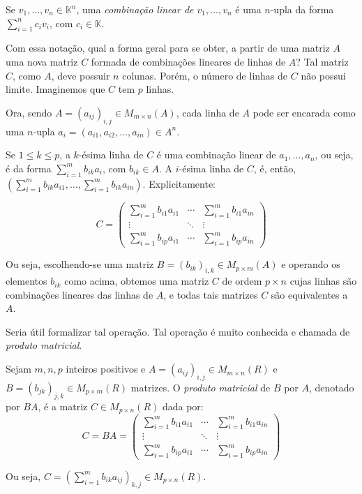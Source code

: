 \begin{definition}
    Se $v_1, \dots, v_n\in \mathbb K^n$, uma \emph{combinação linear de $v_1, \dots, v_n$} é uma $n$-upla da forma $\sum_{i=1}^n c_i v_i$, com $c_i\in \mathbb K$.
\end{definition}

Com essa notação, qual a forma geral para se obter, a partir de uma matriz $A$ uma nova matriz $C$ formada de combinações lineares de linhas de $A$?
Tal matriz $C$, como $A$, deve possuir $n$ colunas. Porém, o número de linhas de $C$ não possui limite. Imaginemos que $C$ tem $p$ linhas.

Ora, sendo $A=(a_{ij})_{i, j}\in M_{m \times n}(A)$, cada linha de $A$ pode ser encarada como uma $n$-upla $a_i=(a_{i1}, a_{i2}, \ldots, a_{in})\in A^n$.

Se $1\leq k \leq p$, a $k$-ésima linha de $C$ é uma combinação linear de $a_1, \dots, a_n$, ou seja, é da forma $\sum_{i=1}^m b_{ik} a_i$, com $b_{ik}\in A$.
A $i$-ésima linha de $C$, é, então, $(\sum_{i=1}^m b_{ik} a_{i1}, \dots, \sum_{i=1}^m b_{ik} a_{in})$.
Explicitamente:

\begin{equation*}
    C = \begin{pmatrix}
        \sum_{i=1}^m b_{i1} a_{i1} & \cdots & \sum_{i=1}^m b_{i1} a_{in} \\
        \vdots & \ddots & \vdots \\
        \sum_{i=1}^m b_{ip} a_{i1} & \cdots & \sum_{i=1}^m b_{ip} a_{in}
    \end{pmatrix}
\end{equation*}

Ou seja, escolhendo-se uma matriz $B=(b_{ik})_{i,k}\in M_{p \times m}(A)$ e operando os elementos $b_{ik}$ como acima, obtemos uma matriz $C$ de ordem $p \times n$ cujas linhas são combinações lineares das linhas de $A$, e todas tais matrizes $C$ são equivalentes a $A$.

Seria útil formalizar tal operação.
Tal operação é muito conhecida e chamada de \emph{produto matricial}.

\begin{definition}
    Sejam $m, n, p$ inteiros positivos e $A=(a_{ij})_{i, j}\in M_{m \times n}(R)$ e $B=(b_{jk})_{j, k}\in M_{p \times m}(R)$ matrizes.
    O \emph{produto matricial} de $B$ por $A$, denotado por $BA$, é a matriz $C\in M_{p \times n}(R)$ dada por:
    \begin{equation*}
        C = BA = \begin{pmatrix}
            \sum_{i=1}^m b_{i1} a_{i1} & \cdots & \sum_{i=1}^m b_{i1} a_{in} \\
            \vdots & \ddots & \vdots \\
            \sum_{i=1}^m b_{ip} a_{i1} & \cdots & \sum_{i=1}^m b_{ip} a_{in}
        \end{pmatrix}
    \end{equation*}

    Ou seja, $C=(\sum_{i=1}^m b_{ik} a_{ij})_{k, j}\in M_{p \times n}(R)$.
\end{definition}

